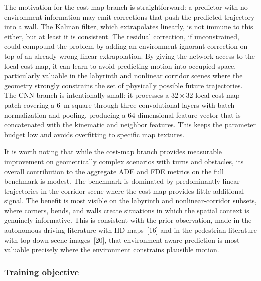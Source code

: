 \documentclass[12pt, a4paper]{article}
\begin{document}
The motivation for the cost-map branch is straightforward: a predictor with no environment information may emit corrections that push the predicted trajectory into a wall. The Kalman filter, which extrapolates linearly, is not immune to this either, but at least it is consistent. The residual correction, if unconstrained, could compound the problem by adding an environment-ignorant correction on top of an already-wrong linear extrapolation. By giving the network access to the local cost map, it can learn to avoid predicting motion into occupied space, particularly valuable in the labyrinth and nonlinear corridor scenes where the geometry strongly constrains the set of physically possible future trajectories. The CNN branch is intentionally small: it processes a $32\times 32$ local cost-map patch covering a $6$~m square through three convolutional layers with batch normalization and pooling, producing a $64$-dimensional feature vector that is concatenated with the kinematic and neighbor features. This keeps the parameter budget low and avoids overfitting to specific map textures.

It is worth noting that while the cost-map branch provides measurable improvement on geometrically complex scenarios with turns and obstacles, its overall contribution to the aggregate ADE and FDE metrics on the full benchmark is modest. The benchmark is dominated by predominantly linear trajectories in the corridor scene where the cost map provides little additional signal. The benefit is most visible on the labyrinth and nonlinear-corridor subsets, where corners, bends, and walls create situations in which the spatial context is genuinely informative. This is consistent with the prior observation, made in the autonomous driving literature with HD maps~[16] and in the pedestrian literature with top-down scene images~[20], that environment-aware prediction is most valuable precisely where the environment constrains plausible motion.

\subsubsection{Training objective}
\label{sec:training}
\end{document}
